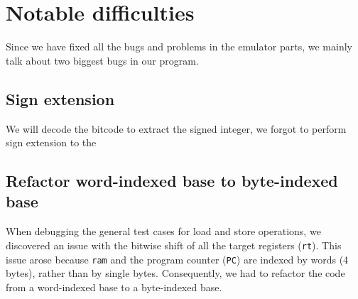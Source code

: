 \documentclass[11pt]{article}
\begin{document}
\section{Notable difficulties}
Since we have fixed all the bugs and problems in the emulator parts, we mainly
talk about two biggest bugs in our program. 

\subsection{Sign extension}
We will decode the bitcode to extract the signed integer, we forgot to perform 
sign extension to the 

\subsection{Refactor word-indexed base to byte-indexed base}
When debugging the general test cases for load and store operations, 
we discovered an issue with the bitwise shift of all the target registers (\texttt{rt}). 
This issue arose because \texttt{ram} and the program counter (\texttt{PC}) are indexed by words (4 bytes), 
rather than by single bytes. 
Consequently, we had to refactor the code from a word-indexed base to a byte-indexed base.
\end{document}
